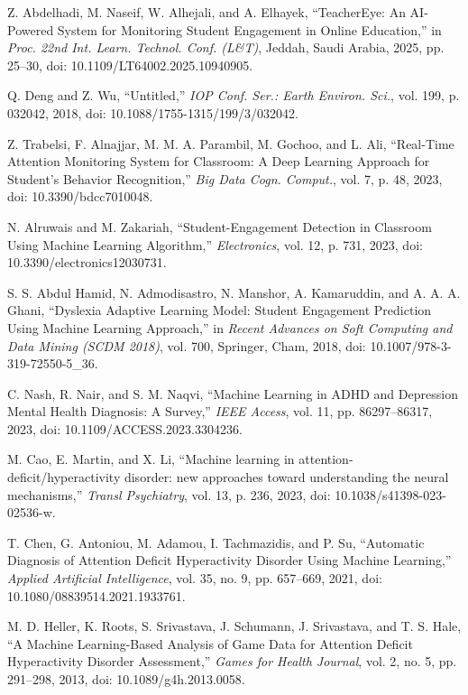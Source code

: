 \documentclass[twocolumn,12pt]{article}
\begin{document}
{\begin{thebibliography}{99}
 Z. Abdelhadi, M. Naseif, W. Alhejali, and A. Elhayek, “TeacherEye: An AI-Powered System for Monitoring Student Engagement in Online Education,” in \textit{Proc. 22nd Int. Learn. Technol. Conf. (L\&T)}, Jeddah, Saudi Arabia, 2025, pp. 25–30, doi: 10.1109/LT64002.2025.10940905.

 Q. Deng and Z. Wu, “Untitled,” \textit{IOP Conf. Ser.: Earth Environ. Sci.}, vol. 199, p. 032042, 2018, doi: 10.1088/1755-1315/199/3/032042.

 Z. Trabelsi, F. Alnajjar, M. M. A. Parambil, M. Gochoo, and L. Ali, “Real-Time Attention Monitoring System for Classroom: A Deep Learning Approach for Student’s Behavior Recognition,” \textit{Big Data Cogn. Comput.}, vol. 7, p. 48, 2023, doi: 10.3390/bdcc7010048.

 N. Alruwais and M. Zakariah, “Student-Engagement Detection in Classroom Using Machine Learning Algorithm,” \textit{Electronics}, vol. 12, p. 731, 2023, doi: 10.3390/electronics12030731.

 S. S. Abdul Hamid, N. Admodisastro, N. Manshor, A. Kamaruddin, and A. A. A. Ghani, “Dyslexia Adaptive Learning Model: Student Engagement Prediction Using Machine Learning Approach,” in \textit{Recent Advances on Soft Computing and Data Mining (SCDM 2018)}, vol. 700, Springer, Cham, 2018, doi: 10.1007/978-3-319-72550-5\_36.

 C. Nash, R. Nair, and S. M. Naqvi, “Machine Learning in ADHD and Depression Mental Health Diagnosis: A Survey,” \textit{IEEE Access}, vol. 11, pp. 86297–86317, 2023, doi: 10.1109/ACCESS.2023.3304236.

 M. Cao, E. Martin, and X. Li, “Machine learning in attention-deficit/hyperactivity disorder: new approaches toward understanding the neural mechanisms,” \textit{Transl Psychiatry}, vol. 13, p. 236, 2023, doi: 10.1038/s41398-023-02536-w.

 T. Chen, G. Antoniou, M. Adamou, I. Tachmazidis, and P. Su, “Automatic Diagnosis of Attention Deficit Hyperactivity Disorder Using Machine Learning,” \textit{Applied Artificial Intelligence}, vol. 35, no. 9, pp. 657–669, 2021, doi: 10.1080/08839514.2021.1933761.

 M. D. Heller, K. Roots, S. Srivastava, J. Schumann, J. Srivastava, and T. S. Hale, “A Machine Learning-Based Analysis of Game Data for Attention Deficit Hyperactivity Disorder Assessment,” \textit{Games for Health Journal}, vol. 2, no. 5, pp. 291–298, 2013, doi: 10.1089/g4h.2013.0058.


\end{thebibliography}}
\end{document}
